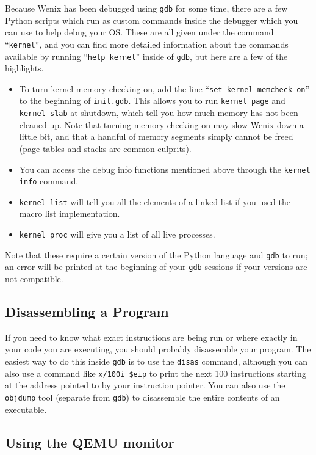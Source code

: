 Because Wenix has been debugged using \texttt{gdb} for some time, there are a few Python scripts which run as custom commands inside the debugger which you can use to help debug your OS. These are all given under the command ``\texttt{kernel}'', and you can find more detailed information about the commands available by running ``\texttt{help kernel}'' inside of \texttt{gdb}, but here are a few of the highlights.
\begin{itemize}
    \item To turn kernel memory checking on, add the line ``\texttt{set kernel memcheck on}'' to the beginning of \texttt{init.gdb}. This allows you to run \texttt{kernel page} and \texttt{kernel slab} at shutdown, which tell you how much memory has not been cleaned up. Note that turning memory checking on may slow Wenix down a little bit, and that a handful of memory segments simply cannot be freed (page tables and stacks are common culprits).
    \item You can access the debug info functions mentioned above through the \texttt{kernel info} command.
    \item \texttt{kernel list} will tell you all the elements of a linked list if you used the macro list implementation.
    \item \texttt{kernel proc} will give you a list of all live processes.
\end{itemize}
Note that these require a certain version of the Python language and \texttt{gdb} to run; an error will be printed at the beginning of your \texttt{gdb} sessions if your versions are not compatible.

\subsection{Disassembling a Program}

If you need to know what exact instructions are being run or where exactly in your code you are executing, you should probably disassemble your program. The easiest way to do this inside \texttt{gdb} is to use the \texttt{disas} command, although you can also use a command like \texttt{x/100i \$eip} to print the next 100 instructions starting at the address pointed to by your instruction pointer. You can also use the \texttt{objdump} tool (separate from \texttt{gdb}) to disassemble the entire contents of an executable.

\subsection{Using the QEMU monitor}


